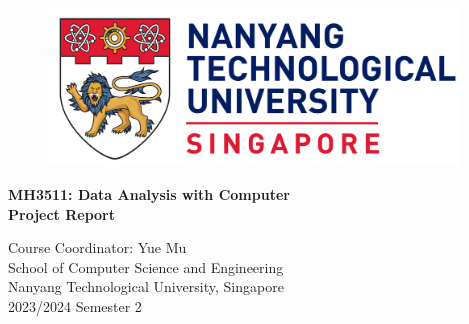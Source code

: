 \begin{titlepage}
	\begin{figure}[!t]
		\centering
		\includegraphics[width = 4.3in]{title/logo.pdf}
	\end{figure}
	
	\centering
	\huge{\textbf{MH3511: Data Analysis with Computer}}\\[0.2in]
	\huge{\textbf{Project Report}}\\[2in]
	

	 \begin{table}[h]
	  \centering
	  \end{table}

	\Large{Course Coordinator: Yue Mu}\\[0.5in]
	
	
	\LARGE{School of Computer Science and Engineering}\\
	\LARGE{Nanyang Technological University, Singapore}\\[0.3in]
	
	
	\LARGE{2023/2024 Semester 2}
	\newpage
\end{titlepage}